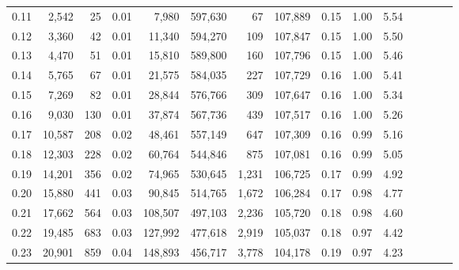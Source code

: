 \begin{tabular}{rrrcrrrrrrrrrrr}
0.11 &   2,542 &     25 &                                       0.01 &    7,980 &  597,630 &       67 &  107,889 &  0.15 &  1.00 &                         5.54 \\
0.12 &   3,360 &     42 &                                       0.01 &   11,340 &  594,270 &      109 &  107,847 &  0.15 &  1.00 &                         5.50 \\
0.13 &   4,470 &     51 &                                       0.01 &   15,810 &  589,800 &      160 &  107,796 &  0.15 &  1.00 &                         5.46 \\
0.14 &   5,765 &     67 &                                       0.01 &   21,575 &  584,035 &      227 &  107,729 &  0.16 &  1.00 &                         5.41 \\
0.15 &   7,269 &     82 &                                       0.01 &   28,844 &  576,766 &      309 &  107,647 &  0.16 &  1.00 &                         5.34 \\
0.16 &   9,030 &    130 &                                       0.01 &   37,874 &  567,736 &      439 &  107,517 &  0.16 &  1.00 &                         5.26 \\
0.17 &  10,587 &    208 &                                       0.02 &   48,461 &  557,149 &      647 &  107,309 &  0.16 &  0.99 &                         5.16 \\
0.18 &  12,303 &    228 &                                       0.02 &   60,764 &  544,846 &      875 &  107,081 &  0.16 &  0.99 &                         5.05 \\
0.19 &  14,201 &    356 &                                       0.02 &   74,965 &  530,645 &    1,231 &  106,725 &  0.17 &  0.99 &                         4.92 \\
0.20 &  15,880 &    441 &                                       0.03 &   90,845 &  514,765 &    1,672 &  106,284 &  0.17 &  0.98 &                         4.77 \\
0.21 &  17,662 &    564 &                                       0.03 &  108,507 &  497,103 &    2,236 &  105,720 &  0.18 &  0.98 &                         4.60 \\
0.22 &  19,485 &    683 &                                       0.03 &  127,992 &  477,618 &    2,919 &  105,037 &  0.18 &  0.97 &                         4.42 \\
0.23 &  20,901 &    859 &                                       0.04 &  148,893 &  456,717 &    3,778 &  104,178 &  0.19 &  0.97 &                         4.23 \\

\end{tabular}
